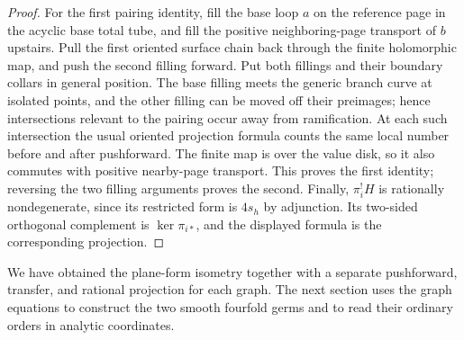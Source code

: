 \begin{proof}
For the first pairing identity, fill the base loop \(a\) on the reference
page in the acyclic base total tube, and fill the positive neighboring-page
transport of \(b\) upstairs. Pull the first oriented surface chain back
through the finite holomorphic map, and push the second filling forward.
Put both fillings
and their boundary collars in general position. The base filling
meets the generic branch curve at isolated points, and the other
filling can be moved off their preimages; hence intersections relevant
to the pairing occur away from ramification. At each such intersection
the usual oriented projection formula counts the same local number
before and after pushforward. The finite map is over the value disk,
so it also commutes with positive nearby-page transport. This proves
the first identity; reversing the two filling arguments proves the
second. Finally, \(\pi_i^!H\) is rationally nondegenerate, since its
restricted form is \(4s_h\) by adjunction. Its two-sided orthogonal
complement is \(\ker\pi_{i*}\), and the displayed formula is the
corresponding projection.
\end{proof}

We have obtained the plane-form isometry together with a separate
pushforward, transfer, and rational projection for each graph.  The next
section uses the graph equations to construct the two smooth fourfold
germs and to read their ordinary orders in analytic coordinates.
